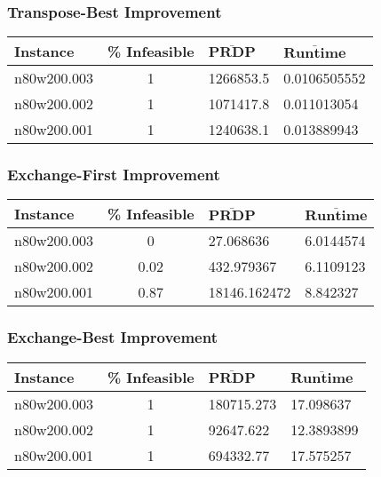 \subsubsection{Transpose-Best Improvement}
\begin{center}
\begin{tabular}{|l|c|l|l|}
\hline
\textbf{Instance}& \textbf{\% Infeasible} & $\mathbf{\bar{PRDP}}$ &$\mathbf{\bar{Runtime}}$\\
\hline
n80w200.003&1&1266853.5&0.0106505552\\
\hline
n80w200.002&1&1071417.8&0.011013054\\
\hline
n80w200.001&1&1240638.1&0.013889943\\
\hline
\end{tabular}
\label{tab:t.b.h}
\end{center}

\subsubsection{Exchange-First Improvement}
\begin{center}
\begin{tabular}{|l|c|l|l|}
\hline
\textbf{Instance}& \textbf{\% Infeasible} & $\mathbf{\bar{PRDP}}$ &$\mathbf{\bar{Runtime}}$\\
\hline
n80w200.003&0&27.068636&6.0144574\\
\hline
n80w200.002&0.02&432.979367&6.1109123\\
\hline
n80w200.001&0.87&18146.162472&8.842327\\
\hline
\end{tabular}
\label{tab:e.f.h}
\end{center}

\subsubsection{Exchange-Best Improvement}
\begin{center}
\begin{tabular}{|l|c|l|l|}
\hline
\textbf{Instance}& \textbf{\% Infeasible} & $\mathbf{\bar{PRDP}}$ &$\mathbf{\bar{Runtime}}$\\
\hline
n80w200.003&1&180715.273&17.098637\\
\hline
n80w200.002&1&92647.622&12.3893899\\
\hline
n80w200.001&1&694332.77&17.575257\\
\hline
\end{tabular}
\label{tab:e.b.h}
\end{center}


